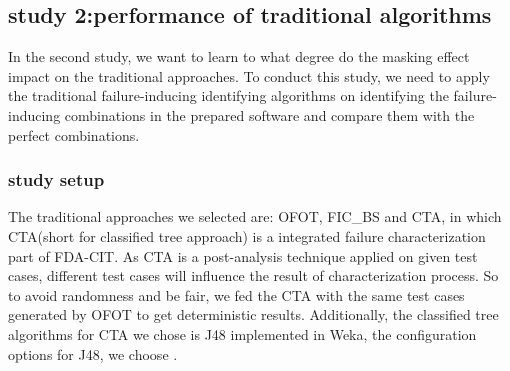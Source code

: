 \documentclass{sig-alternate}
\begin{document}
\subsection{study 2:performance of traditional algorithms}
In the second study, we want to learn to what degree do the masking effect impact on the traditional approaches. To conduct this study, we need to apply the traditional failure-inducing identifying algorithms on identifying the failure-inducing combinations in the prepared software and compare them with the perfect combinations.

%


\subsubsection{study setup}
The traditional approaches we selected are: OFOT\cite{nie2011minimal}, FIC\_BS \cite{zhang2011characterizing} and CTA\cite{yilmaz2006covering}, in which CTA(short for classified tree approach) is a integrated failure characterization part of FDA-CIT\cite{yilmaz2013reducing}. As CTA is a post-analysis technique applied on given test cases, different test cases will influence the result of characterization process. So to avoid randomness and be fair, we fed the CTA with the same test cases generated by OFOT to get deterministic results. Additionally, the classified tree algorithms for CTA we chose is J48 implemented in Weka, the configuration options for J48, we choose .
\end{document}
